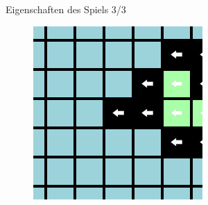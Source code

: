 \documentclass[aspectratio=169]{beamer}
\begin{document}
\begin{frame}{Eigenschaften des Spiels 3/3}
\begin{multicols*}{3}
      \begin{figure}[H]
        \centering
        \includegraphics[width = 0.39 \textheight]{example2_3.png}
      \end{figure}

    \end{multicols*}

  \end{frame}
\end{document}

